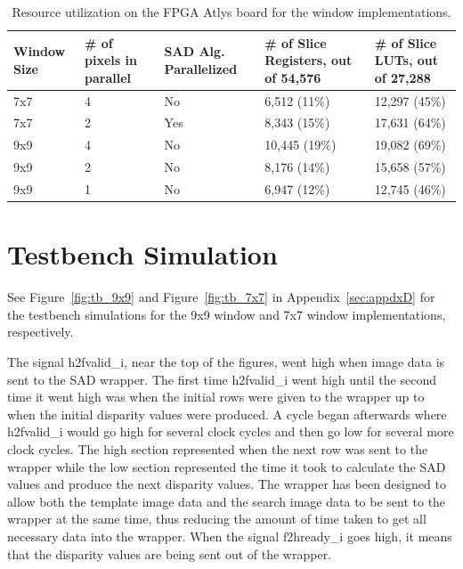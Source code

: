 \begin{table}
\begin{center}
	\begin{tabular}{| p{1.9cm} | p{2.2cm} | p{2.5cm} | p{2.9cm} | p{2.7cm} |}
		\hline
		\rowstyle{\bfseries} Window Size & 
		\rowstyle{\bfseries} \# of pixels in parallel & 
		\rowstyle{\bfseries} SAD Alg. Parallelized & 
		\rowstyle{\bfseries} \# of Slice Registers, out of 54,576 &
		\rowstyle{\bfseries} \# of Slice LUTs, out of 27,288 %
		\tabularnewline
		\hline
		7x7 & 4 & No & 6,512 (11\%) & 12,297 (45\%) %
		\tabularnewline
		\hline 
		\rowstyle{\bfseries} 7x7 & 
		\rowstyle{\bfseries} 2 & 
		\rowstyle{\bfseries} Yes & 
		\rowstyle{\bfseries} 8,343 (15\%) & 
		\rowstyle{\bfseries} 17,631 (64\%) %
		\tabularnewline
		\hline 
		\rowstyle{\bfseries} 9x9 & 
		\rowstyle{\bfseries} 4 & 
		\rowstyle{\bfseries} No & 
		\rowstyle{\bfseries} 10,445 (19\%) & 
		\rowstyle{\bfseries} 19,082 (69\%) %
		\tabularnewline
		\hline
		9x9 & 2 & No & 8,176 (14\%) & 15,658 (57\%) %
		\tabularnewline
		\hline 
		9x9 & 1 & No & 6,947 (12\%) & 12,745 (46\%) %
		\tabularnewline
		\hline 
	\end{tabular}
	\captionfonts
	\caption{Resource utilization on the FPGA Atlys board for the window implementations.}
	\label{table:utilize}
\end{center}
\end{table}

\section{Testbench Simulation}
\label{sec:testbench}

See Figure~\ref{fig:tb_9x9} and Figure~\ref{fig:tb_7x7} in Appendix~\ref{sec:appdxD} for the testbench simulations for the 9x9 window and 7x7 window implementations, respectively.

The signal h2fvalid\_i, near the top of the figures, went high when image data is sent to the SAD wrapper. The first time h2fvalid\_i went high until the second time it went high was when the initial rows were given to the wrapper up to when the initial disparity values were produced. A cycle began afterwards where h2fvalid\_i would go high for several clock cycles and then go low for several more clock cycles. The high section represented when the next row was sent to the wrapper while the low section represented the time it took to calculate the SAD values and produce the next disparity values. The wrapper has been designed to allow both the template image data and the search image data to be sent to the wrapper at the same time, thus reducing the amount of time taken to get all necessary data into the wrapper. When the signal f2hready\_i goes high, it means that the disparity values are being sent out of the wrapper.

